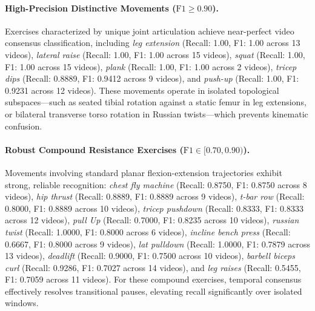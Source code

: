 \documentclass[runningheads]{llncs}
\begin{document}
\paragraph{High-Precision Distinctive Movements ($\text{F1} \ge 0.90$).} Exercises characterized by unique joint articulation achieve near-perfect video consensus classification, including \textit{leg extension} (Recall: 1.00, F1: 1.00 across 13 videos), \textit{lateral raise} (Recall: 1.00, F1: 1.00 across 15 videos), \textit{squat} (Recall: 1.00, F1: 1.00 across 15 videos), \textit{plank} (Recall: 1.00, F1: 1.00 across 2 videos), \textit{tricep dips} (Recall: 0.8889, F1: 0.9412 across 9 videos), and \textit{push-up} (Recall: 1.00, F1: 0.9231 across 12 videos). These movements operate in isolated topological subspaces---such as seated tibial rotation against a static femur in leg extensions, or bilateral transverse torso rotation in Russian twists---which prevents kinematic confusion.

\paragraph{Robust Compound Resistance Exercises ($\text{F1} \in [0.70, 0.90)$).} Movements involving standard planar flexion-extension trajectories exhibit strong, reliable recognition: \textit{chest fly machine} (Recall: 0.8750, F1: 0.8750 across 8 videos), \textit{hip thrust} (Recall: 0.8889, F1: 0.8889 across 9 videos), \textit{t-bar row} (Recall: 0.8000, F1: 0.8889 across 10 videos), \textit{tricep pushdown} (Recall: 0.8333, F1: 0.8333 across 12 videos), \textit{pull Up} (Recall: 0.7000, F1: 0.8235 across 10 videos), \textit{russian twist} (Recall: 1.0000, F1: 0.8000 across 6 videos), \textit{incline bench press} (Recall: 0.6667, F1: 0.8000 across 9 videos), \textit{lat pulldown} (Recall: 1.0000, F1: 0.7879 across 13 videos), \textit{deadlift} (Recall: 0.9000, F1: 0.7500 across 10 videos), \textit{barbell biceps curl} (Recall: 0.9286, F1: 0.7027 across 14 videos), and \textit{leg raises} (Recall: 0.5455, F1: 0.7059 across 11 videos). For these compound exercises, temporal consensus effectively resolves transitional pauses, elevating recall significantly over isolated windows.
\end{document}
